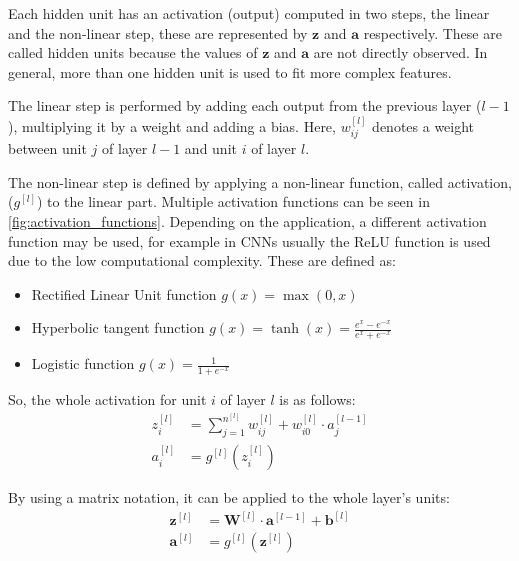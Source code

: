 Each hidden unit has an activation (output) computed in two steps, the linear and the 
non-linear step, these are represented by \( \bm{z} \) and \( \bm{a} \) respectively.
These are called hidden units because the values of \( \bm{z} \) and \( \bm{a} \) are 
not directly observed. In general, more than one hidden unit is used to fit more complex 
features.

The linear step is performed by adding each output from the
previous layer (\( l - 1 \)), multiplying it by a weight and adding a bias.
Here, \(w_{ij}^{[l]}\) denotes a weight between unit \( j \) of layer \( l - 1 \) 
and unit \( i \) of layer \( l \). 

The non-linear step is defined by applying a non-linear function, called activation, 
(\( g^{[l]} \)) to the linear part. 
Multiple activation functions can be seen in \autoref{fig:activation_functions}. Depending
on the application, a different activation function may be used, for example in 
\glspl{CNN} usually the ReLU function is used due to the low computational complexity. 
These are defined as:
~\cite{neural:bishop}
\begin{itemize}[itemsep=1ex]
  \item Rectified Linear Unit function 
  \( g(x) = \max(0, x) \)
  \item Hyperbolic tangent function 
  \( \displaystyle g(x) = \tanh(x) = \frac{e^x - e^{-x}}{e^x + e^{-x}}\)
  \item Logistic function 
  \( \displaystyle g(x) = \frac{1}{1 + e^{-x}} \)
\end{itemize}

So, the whole activation for unit \( i \) of layer \( l \) is as follows:
\begin{align*}
  z_i^{[l]} &= \sum_{j = 1}^{n^{[l]}} w_{ij}^{[l]} + w_{i0}^{[l]} \cdot a_j^{[l - 1]} \\
  a_i^{[l]} &= g^{[l]}(z_i^{[l]})
\end{align*}

By using a matrix notation, it can be applied to the whole layer's units:
\begin{align*}
  \bm{z}^{[l]} &= \bm{W}^{[l]} \cdot \bm{a}^{[l - 1]} + \bm{b}^{[l]} \\
  \bm{a}^{[l]} &= g^{[l]}(\bm{z}^{[l]})
\end{align*}



